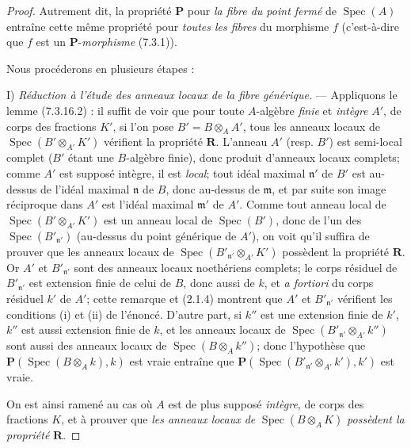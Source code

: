 \begin{proof}
Autrement dit, la propriété $\boldsymbol P$ pour \emph{la fibre du point fermé} de
$\operatorname{Spec}(A)$ entraîne cette même propriété pour \emph{toutes les
fibres} du morphisme $f$ (c'est-à-dire que $f$ est un
$\boldsymbol P$-\emph{morphisme} (7.3.1)).

Nous procéderons en plusieurs étapes :

I) \emph{Réduction à l'étude des anneaux locaux de la fibre générique.} ---
Appliquons le lemme (7.3.16.2) : il suffit de voir que pour toute
$A$-algèbre \emph{finie} et \emph{intègre} $A'$, de corps des fractions $K'$, si l'on
pose $B'=B\otimes_A A'$, tous les anneaux locaux de
$\operatorname{Spec}(B'\otimes_{A'}K')$ vérifient la propriété
$\boldsymbol R$. L'anneau $A'$ (resp. $B'$) est semi-local complet ($B'$
étant une $B$-algèbre finie), donc produit d'anneaux locaux complets; comme
$A'$ est supposé intègre, il est \emph{local}; tout idéal maximal $\mathfrak n'$ de
$B'$ est au-dessus de l'idéal maximal $\mathfrak n$ de $B$, donc au-dessus
de $\mathfrak m$, et par suite son image réciproque dans $A'$ est l'idéal
maximal $\mathfrak m'$ de $A'$. Comme tout anneau local de
$\operatorname{Spec}(B'\otimes_{A'}K')$ est un anneau local de
$\operatorname{Spec}(B')$, donc de l'un des
$\operatorname{Spec}(B'_{\mathfrak n'})$ (au-dessus du point générique de
$A'$), on voit qu'il suffira de prouver que les anneaux locaux de
$\operatorname{Spec}(B'_{\mathfrak n'}\otimes_{A'}K')$
possèdent la propriété $\boldsymbol R$. Or $A'$ et
$B'_{\mathfrak n'}$ sont des anneaux locaux noethériens complets; le corps
résiduel de $B'_{\mathfrak n'}$ est extension finie de celui de $B$, donc
aussi de $k$, et \emph{a fortiori} du corps résiduel $k'$ de $A'$; cette
remarque et (2.1.4) montrent que $A'$ et $B'_{\mathfrak n'}$ vérifient les
conditions (i) et (ii) de l'énoncé. D'autre part, si $k''$ est une extension
finie de $k'$, $k''$ est aussi extension finie de $k$, et les anneaux locaux
de
$\operatorname{Spec}(B'_{\mathfrak n'}\otimes_{A'}k'')$
sont aussi des anneaux locaux de $\operatorname{Spec}(B\otimes_A k'')$;
donc l'hypothèse que
$\boldsymbol P(\operatorname{Spec}(B\otimes_A k),k)$ est vraie entraîne que
$\boldsymbol P(\operatorname{Spec}(B'_{\mathfrak n'}\otimes_{A'}k'),k')$
est vraie.

On est ainsi ramené au cas où $A$ est de plus supposé \emph{intègre}, de corps des
fractions $K$, et à prouver que \emph{les anneaux locaux de}
$\operatorname{Spec}(B\otimes_A K)$ \emph{possèdent la propriété}
$\boldsymbol R$.


\end{proof}
